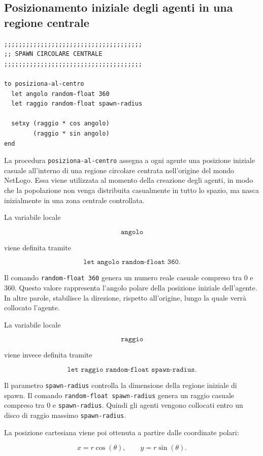 \subsection{Posizionamento iniziale degli agenti in una regione centrale}

\begin{lstlisting}[caption={Procedura di spawn circolare centrale}]
;;;;;;;;;;;;;;;;;;;;;;;;;;;;;;;;;;;;;;
;; SPAWN CIRCOLARE CENTRALE
;;;;;;;;;;;;;;;;;;;;;;;;;;;;;;;;;;;;;;

to posiziona-al-centro
  let angolo random-float 360
  let raggio random-float spawn-radius

  setxy (raggio * cos angolo)
        (raggio * sin angolo)
end
\end{lstlisting}

La procedura \texttt{posiziona-al-centro} assegna a ogni agente una posizione
iniziale casuale all'interno di una regione circolare centrata nell'origine del
mondo NetLogo. Essa viene utilizzata al momento della creazione degli agenti, in
modo che la popolazione non venga distribuita casualmente in tutto lo spazio, ma
nasca inizialmente in una zona centrale controllata.

La variabile locale

\[
\texttt{angolo}
\]

viene definita tramite

\[
\texttt{let angolo random-float 360}.
\]

Il comando \texttt{random-float 360} genera un numero reale casuale compreso tra
\(0\) e \(360\). Questo valore rappresenta l'angolo polare della posizione
iniziale dell'agente. In altre parole, stabilisce la direzione, rispetto
all'origine, lungo la quale verrà collocato l'agente.

La variabile locale

\[
\texttt{raggio}
\]

viene invece definita tramite

\[
\texttt{let raggio random-float spawn-radius}.
\]

Il parametro \texttt{spawn-radius} controlla la dimensione della regione iniziale
di spawn. Il comando \texttt{random-float spawn-radius} genera un raggio casuale
compreso tra \(0\) e \texttt{spawn-radius}. Quindi gli agenti vengono collocati
entro un disco di raggio massimo \texttt{spawn-radius}.

La posizione cartesiana viene poi ottenuta a partire dalle coordinate polari:

\[
x = r \cos(\theta),
\qquad
y = r \sin(\theta).
\]

